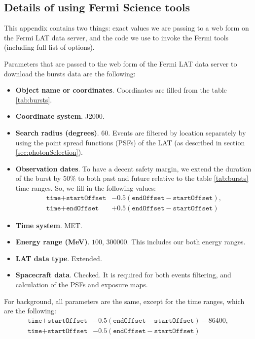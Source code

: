 \documentclass{article}
\begin{document}
\begin{appendices}

\section{Details of using Fermi Science tools}
\label{sec:fermiCode}
This appendix contains two things: exact values we are passing to a web form on the Fermi LAT data server, and the code we use to invoke the Fermi tools (including full list of options).

Parameters that are passed to the web form of the Fermi LAT data server to download the bursts data are the following:
\begin{itemize}
	\item{
		{\bf Object name or coordinates}.
		Coordinates are filled from the table \ref{tab:bursts}.
	}
	\item{
		{\bf Coordinate system}.
		J2000.
	}
	\item{
		{\bf Search radius (degrees)}.
		$60$.
		Events are filtered by location separately by using the point spread functions (PSFs) of the LAT (as described in section \ref{sec:photonSelection}).
	}
	\item{
		{\bf Observation dates}.
		To have a decent safety margin, we extend the duration of the burst by $50\%$ to both past and future relative to the table \ref{tab:bursts} time ranges.
		So, we fill in the following values:
		\begin{align*}
			\texttt{time} + \texttt{startOffset} &- 0.5\left(\texttt{endOffset}-\texttt{startOffset}\right),\\
			\texttt{time} + \texttt{endOffset} &+ 0.5\left(\texttt{endOffset}-\texttt{startOffset}\right)
		\end{align*}
	}
	\item{
		{\bf Time system}.
		MET.
	}
	\item{
		{\bf Energy range (MeV)}.
		$100,\,300000$.
		This includes our both energy ranges.
	}
	\item{
		{\bf LAT data type}.
		Extended.
	}
	\item{
		{\bf Spacecraft data}.
		Checked.
		It is required for both events filtering, and calculation of the PSFs and exposure maps.
	}
\end{itemize}

For background, all parameters are the same, except for the time ranges, which are the following:
\begin{align*}
	\texttt{time} + \texttt{startOffset} &- 0.5\left(\texttt{endOffset} - \texttt{startOffset}\right) - 86400,\\
	\texttt{time} + \texttt{startOffset} &- 0.5\left(\texttt{endOffset} - \texttt{startOffset}\right)
\end{align*}


\end{appendices}
\end{document}
